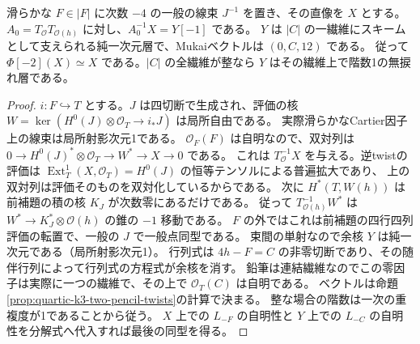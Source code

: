 \begin{theorem}\label{thm:octic-fiber-twist-transfer}
滑らかな $F\in|F|$ に次数 $-4$ の一般の線束 $J^{-1}$ を置き、その直像を $X$ とする。
$A_0=T_{\mathcal O}T_{\mathcal O(h)}$ に対し、$A_0^{-1}X=Y[-1]$ である。
$Y$ は $|C|$ の一繊維にスキームとして支えられる純一次元層で、Mukaiベクトルは $(0,C,12)$ である。
従って $\Phi[-2](X)\simeq X$ である。$|C|$ の全繊維が整なら $Y$ はその繊維上で階数1の無捩れ層である。
\end{theorem}
\begin{proof}
$i:F\hookrightarrow T$ とする。$J$ は四切断で生成され、評価の核
$W=\ker(H^0(J)\otimes\mathcal O_T\to i_*J)$ は局所自由である。
実際滑らかなCartier因子上の線束は局所射影次元1である。
$\mathcal O_F(F)$ は自明なので、双対列は
$0\to H^0(J)^*\otimes\mathcal O_T\to W^*\to X\to0$ である。
これは $T_{\mathcal O}^{-1}X$ を与える。逆twistの評価は
$\operatorname{Ext}^1_T(X,\mathcal O_T)=H^0(J)$ の恒等テンソルによる普遍拡大であり、
上の双対列は評価そのものを双対化しているからである。
次に $H^*(T,W(h))$ は前補題の積の核 $K_J$ が次数零にあるだけである。
従って $T_{\mathcal O(h)}^{-1}W^*$ は $W^*\to K_J^*\otimes\mathcal O(h)$ の錐の $-1$ 移動である。
$F$ の外ではこれは前補題の四行四列評価の転置で、一般の $J$ で一般点同型である。
束間の単射なので余核 $Y$ は純一次元である（局所射影次元1）。
行列式は $4h-F=C$ の非零切断であり、その随伴行列によって行列式の方程式が余核を消す。
鉛筆は連結繊維なのでこの零因子は実際に一つの繊維で、その上で $\mathcal O_T(C)$ は自明である。
ベクトルは命題\ref{prop:quartic-k3-two-pencil-twists}の計算で決まる。
整な場合の階数は一次の重複度が1であることから従う。
$X$ 上での $L_{-F}$ の自明性と $Y$ 上での $L_{-C}$ の自明性を分解式へ代入すれば最後の同型を得る。
\end{proof}
